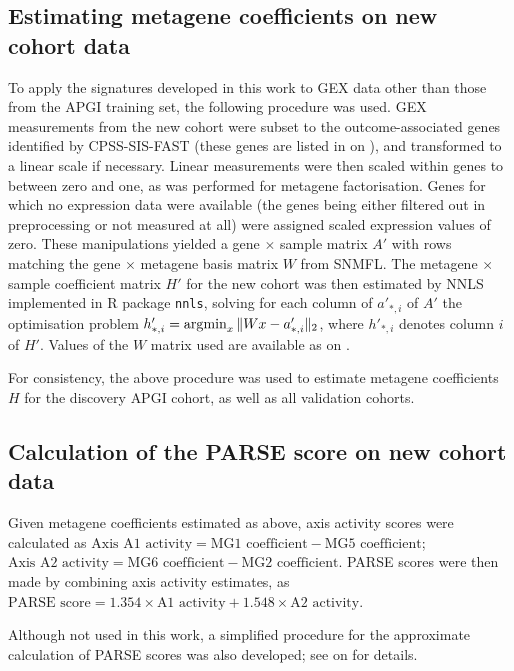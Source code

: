 \documentclass[dissertation.tex]{subfiles}
\begin{document}
\subsection{Estimating metagene coefficients on new cohort data}
To apply the signatures developed in this work to \gls{GEX} data other than those from the \gls{APGI} training set, the following procedure was used.  \Gls{GEX} measurements from the new cohort were subset to the  outcome-associated genes identified by \gls{CPSS}-\gls{SIS}-\gls{FAST} (these genes are listed in  on ), and transformed to a linear scale if necessary.  Linear measurements were then scaled within genes to between zero and one, as was performed for metagene factorisation.  Genes for which no expression data were available (the genes being either filtered out in preprocessing or not measured at all) were assigned scaled expression values of zero.  These manipulations yielded a gene $\times$ sample matrix $A'$ with rows matching the gene $\times$ metagene basis matrix $W$ from \gls{SNMFL}.  The metagene $\times$ sample coefficient matrix $H'$ for the new cohort was then estimated by \gls{NNLS} implemented in R package \texttt{nnls}, solving for each column of $a'_{*,i}$ of $A'$ the optimisation problem ${h'_{*,i}} = \operatorname*{\arg\!\min}_x \| W x - a'_{*,i} \|_2$, where $h'_{*,i}$ denotes column $i$ of $H'$.  Values of the $W$ matrix used are available as  on .

For consistency, the above procedure was used to estimate metagene coefficients $H$ for the discovery \gls{APGI} cohort, as well as all validation cohorts.

\subsection{Calculation of the \texorpdfstring{\acrshort{PARSE}}{PARSE} score on new cohort data}
Given metagene coefficients estimated as above, axis activity scores were calculated as $\text{Axis A1 activity} = \text{MG1 coefficient} - \text{MG5 coefficient}$; $\text{Axis A2 activity} = \text{MG6 coefficient} - \text{MG2 coefficient}$.  \gls{PARSE} scores were then made by combining axis activity estimates, as $\text{PARSE score} = 1.354 \times \text{A1 activity} + 1.548 \times \text{A2 activity}$.

Although not used in this work, a simplified procedure for the approximate calculation of \gls{PARSE} scores was also developed; see  on  for details.
\end{document}
